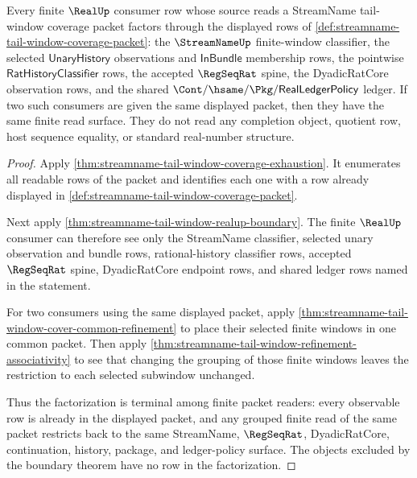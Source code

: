 \begin{theorem}
\label{thm:streamname-tail-window-terminal-consumer-factorization}
Every finite $\RealUp$ consumer row whose source reads a StreamName
tail-window coverage packet factors through the displayed rows of
\autoref{def:streamname-tail-window-coverage-packet}: the
$\StreamNameUp$ finite-window classifier, the selected
$\mathsf{UnaryHistory}$ observations and $\mathsf{InBundle}$ membership rows,
the pointwise $\mathsf{RatHistoryClassifier}$ rows, the accepted
$\RegSeqRat$ spine, the DyadicRatCore observation rows, and the shared
$\Cont/\hsame/\Pkg/\mathsf{RealLedgerPolicy}$ ledger. If two such consumers
are given the same displayed packet, then they have the same finite read
surface. They do not read any completion object, quotient row, host sequence
equality, or standard real-number structure.
\end{theorem}
\begin{proof}
Apply \autoref{thm:streamname-tail-window-coverage-exhaustion}. It enumerates
all readable rows of the packet and identifies each one with a row already
displayed in \autoref{def:streamname-tail-window-coverage-packet}.

Next apply \autoref{thm:streamname-tail-window-realup-boundary}. The finite
$\RealUp$ consumer can therefore see only the StreamName classifier,
selected unary observation and bundle rows, rational-history classifier rows,
accepted $\RegSeqRat$ spine, DyadicRatCore endpoint rows, and shared ledger
rows named in the statement.

For two consumers using the same displayed packet, apply
\autoref{thm:streamname-tail-window-cover-common-refinement} to place their
selected finite windows in one common packet. Then apply
\autoref{thm:streamname-tail-window-refinement-associativity} to see that
changing the grouping of those finite windows leaves the restriction to each
selected subwindow unchanged.

Thus the factorization is terminal among finite packet readers: every
observable row is already in the displayed packet, and any grouped finite
read of the same packet restricts back to the same StreamName, $\RegSeqRat$,
DyadicRatCore, continuation, history, package, and ledger-policy surface. The
objects excluded by the boundary theorem have no row in the factorization.
\end{proof}

